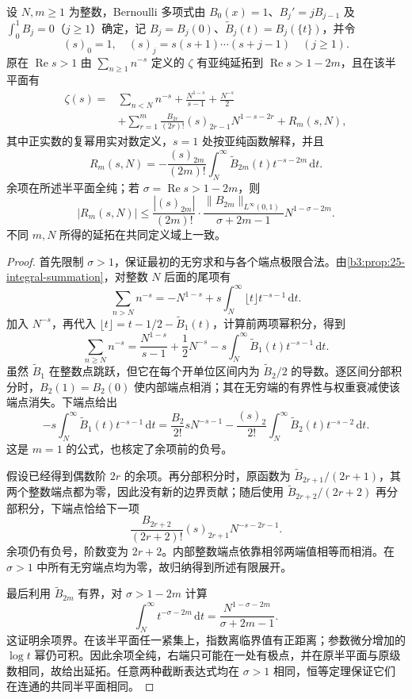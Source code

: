 \begin{proposition}\label{b3:prop:26-euler-maclaurin}
设 \(N,m\ge1\) 为整数，Bernoulli 多项式由 \(B_0(x)=1\)、\(B_j'=jB_{j-1}\) 及 \(\int_0^1B_j=0\)（\(j\ge1\)）确定，记 \(B_j=B_j(0)\)、\(\widetilde B_j(t)=B_j(\{t\})\)，并令
\[
 (s)_0=1,\quad (s)_j=s(s+1)\cdots(s+j-1)\quad(j\ge1).
\]
原在 \(\operatorname{Re}s>1\) 由 \(\sum_{n\ge1}n^{-s}\) 定义的 \(\zeta\) 有亚纯延拓到 \(\operatorname{Re}s>1-2m\)，且在该半平面有
\begin{equation}\label{b3:eq:26-euler-maclaurin}
 \begin{aligned}
 \zeta(s)={}&\sum_{n<N}n^{-s}+\frac{N^{1-s}}{s-1}+\frac{N^{-s}}2\\
 &+\sum_{r=1}^m\frac{B_{2r}}{(2r)!}
       (s)_{2r-1}N^{1-s-2r}+R_m(s,N),
 \end{aligned}
\end{equation}
其中正实数的复幂用实对数定义，\(s=1\) 处按亚纯函数解释，并且
\[
 R_m(s,N)=-\frac{(s)_{2m}}{(2m)!}
       \int_N^\infty\widetilde B_{2m}(t)t^{-s-2m}\,\mathrm dt.
\]
余项在所述半平面全纯；若 \(\sigma=\operatorname{Re}s>1-2m\)，则
\begin{equation}\label{b3:eq:26-euler-maclaurin-bound}
 |R_m(s,N)|\le
 \frac{|(s)_{2m}|}{(2m)!}\cdot
 \frac{\|B_{2m}\|_{L^\infty(0,1)}}{\sigma+2m-1}
 N^{1-\sigma-2m}.
\end{equation}
不同 \(m,N\) 所得的延拓在共同定义域上一致。
\end{proposition}
\begin{proof}
首先限制 \(\sigma>1\)，保证最初的无穷求和与各个端点极限合法。由\cref{b3:prop:25-integral-summation}，对整数 \(N\) 后面的尾项有
\[
 \sum_{n>N}n^{-s}
 =-N^{1-s}+s\int_N^\infty\lfloor t\rfloor t^{-s-1}\,\mathrm dt.
\]
加入 \(N^{-s}\)，再代入 \(\lfloor t\rfloor=t-1/2-\widetilde B_1(t)\)，计算前两项幂积分，得到
\[
 \sum_{n\ge N}n^{-s}
 =\frac{N^{1-s}}{s-1}+\frac12N^{-s}
       -s\int_N^\infty\widetilde B_1(t)t^{-s-1}\,\mathrm dt.
\]
虽然 \(\widetilde B_1\) 在整数点跳跃，但它在每个开单位区间内为 \(\widetilde B_2/2\) 的导数。逐区间分部积分时，\(B_2(1)=B_2(0)\) 使内部端点相消；其在无穷端的有界性与权重衰减使该端点消失。下端点给出
\[
 -s\int_N^\infty\widetilde B_1(t)t^{-s-1}\,\mathrm dt
 =\frac{B_2}{2!}sN^{-s-1}
       -\frac{(s)_2}{2!}\int_N^\infty
                     \widetilde B_2(t)t^{-s-2}\,\mathrm dt.
\]
这是 \(m=1\) 的公式，也核定了余项前的负号。

假设已经得到偶数阶 \(2r\) 的余项。再分部积分时，原函数为 \(\widetilde B_{2r+1}/(2r+1)\)，其两个整数端点都为零，因此没有新的边界贡献；随后使用 \(\widetilde B_{2r+2}/(2r+2)\) 再分部积分，下端点恰给下一项
\[
 \frac{B_{2r+2}}{(2r+2)!}(s)_{2r+1}N^{-s-2r-1}.
\]
余项仍有负号，阶数变为 \(2r+2\)。内部整数端点依靠相邻两端值相等而相消。在 \(\sigma>1\) 中所有无穷端点均为零，故归纳得到所述有限展开。

最后利用 \(\widetilde B_{2m}\) 有界，对 \(\sigma>1-2m\) 计算
\[
 \int_N^\infty t^{-\sigma-2m}\,\mathrm dt
 =\frac{N^{1-\sigma-2m}}{\sigma+2m-1}.
\]
这证明余项界。在该半平面任一紧集上，指数离临界值有正距离；参数微分增加的 \(\log t\) 幂仍可积。因此余项全纯，右端只可能在一处有极点，并在原半平面与原级数相同，故给出延拓。任意两种截断表达式均在 \(\sigma>1\) 相同，恒等定理保证它们在连通的共同半平面相同。
\end{proof}

